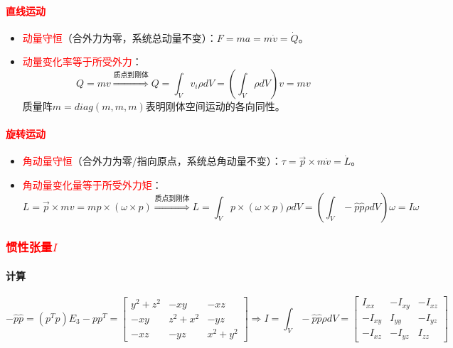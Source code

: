 \documentclass[
12pt, %
a4paper, 
oneside, %
]{scrartcl}
\begin{document}
\paragraph{\textcolor{red}{直线运动}}
\begin{itemize}
\item \textcolor{red}{动量守恒}（合外力为零，系统总动量不变）：$ F = ma = m \dot{v} = \dot{Q} $。
\item \textcolor{red}{动量变化率等于所受外力}：
$$ Q = mv \overset{\text{质点到刚体}}{\Longrightarrow} Q = \int_V v_i \rho dV = (\int_V \rho dV) v = mv $$
质量阵$ m = diag(m, m, m) $表明刚体空间运动的各向同性。
\end{itemize} 
\paragraph{\textcolor{red}{旋转运动}}
\begin{itemize}
\item \textcolor{red}{角动量守恒}（合外力为零/指向原点，系统总角动量不变）：$ \tau = \vec{p} \times m \dot{v} = \dot{L} $。
\item \textcolor{red}{角动量变化量等于所受外力矩}：
$$ L = \vec{p} \times mv = mp \times (\omega \times p) \overset{\text{质点到刚体}}{\Longrightarrow} L = \int_V p \times (\omega \times p) \rho dV = (\int_V -\hat{p} \hat{p} \rho dV)\omega = I \omega $$
\end{itemize} 
\subsubsection[惯性张量]{\textcolor{red}{惯性张量$ I $}}
\paragraph{计算}
$$ -\hat{p} \hat{p} = (p^T p)E_3 - p p^T = \begin{bmatrix} y^2 + z^2 & -xy & -xz \\ -xy & z^2 + x^2 & -yz \\ -xz & -yz & x^2 + y^2 \end{bmatrix} \Rightarrow I = \int_V -\hat{p} \hat{p} \rho dV = \begin{bmatrix} I_{xx} & -I_{xy} & -I_{xz} \\ -I_{xy} & I_{yy} & -I_{yz} \\ -I_{xz} & -I_{yz} & I_{zz} \end{bmatrix} $$
\end{document}
